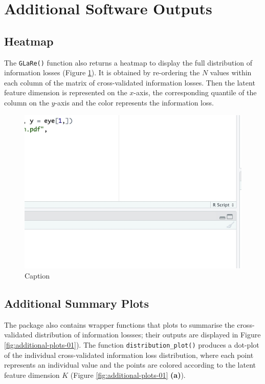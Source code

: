 \section{Additional Software Outputs}\label{sec:additional-outputs}


\subsection{Heatmap}

The \texttt{GLaRe()} function also returns a heatmap to display the full distribution of information losses (Figure \ref{fig:eye-heatmap}).
It is obtained by re-ordering the $N$ values within each column of the matrix of cross-validated information losses.
Then the latent feature dimension is represented on the $x$-axis, the corresponding quantile of the column on the $y$-axis and the color represents the information loss.


\begin{figure}
    \centering
    \includegraphics[width=0.75\linewidth]{figures/eye-heatmap.jpeg}
    \caption{Caption}
    \label{fig:eye-heatmap}
\end{figure}

\subsection{Additional Summary Plots}

The  package also contains wrapper functions that plots to summarise the cross-validated distribution of information lossses; their outputs are displayed in Figure \ref{fig:additional-plots-01}).
The function \texttt{distribution\_plot()} produces a dot-plot of the individual cross-validated information loss distribution, where each point represents an individual value and the points are colored according to the latent feature dimension $K$ (Figure \ref{fig:additional-plots-01} \textbf{(a)}).

